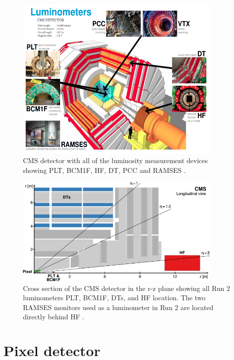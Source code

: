 \begin{figure}[!htp]
\centering
\includegraphics[width=0.9\textwidth]{ashish_thesis/luminometer_cms.png}
\caption[CMS Luminometers]{%
   CMS detector with all of the luminosity measurement devices showing PLT, BCM1F, HF, DT, PCC and RAMSES \cite{meyer2021luminosity}. 
}
\label{fig:lumino_cms}
\end{figure}


\begin{figure}[!htp]
\centering
\includegraphics[width=0.9\textwidth]{ashish_thesis/luminometer_cms_pseudo.png}
\caption[CMS luminometers Location]{%
    Cross section of the CMS detector in the r-z plane showing all Run 2 luminometers PLT, BCM1F, DTs, and HF location. The two RAMSES monitors used as a luminometer in Run 2 are located directly behind HF \cite{Sirunyan:2759951}. 
}
\label{fig:lumino_cms_pseudo}
\end{figure}

\section{Pixel detector}

